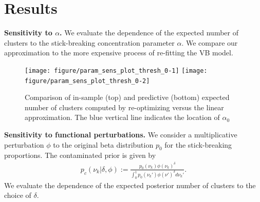 \documentclass[a0,plainsections]{sciposter}\usepackage[]{graphicx}\usepackage[]{color}
\newenvironment{knitrout}{}{} %
\newcommand{\Expect}{\mathbb{E}}
\newcommand{\etazopt}{\eta_z^{*}}
\newcommand{\etathetaopt}{\eta_\theta^{*}}
\newcommand{\QExpect}
{\Expect_{q\left(\theta, z \vert \eta_\theta, \etazopt(\eta_\theta)\right)}}
\begin{document}
\begin{minipage}[t]{0.45\textwidth}




\section*{Results}
\vspace{-0.3in}
{\bf \large Sensitivity to $\alpha$. }
We evaluate the dependence of the expected number of clusters to the stick-breaking concentration parameter $\alpha$. We compare our approximation to the more expensive process of re-fitting the VB model.  
%




\begin{figure}
\centering
\begin{knitrout}
\color{fgcolor}

{\centering \texttt{[image: figure/param\_sens\_plot\_thresh\_0-1]} 
\texttt{[image: figure/param\_sens\_plot\_thresh\_0-2]} 

}



\end{knitrout}
\caption{Comparison of in-sample (top) and predictive (bottom) expected number of clusters computed by re-optimizing versus the linear approximation. 
The blue vertical line indicates the location of $\alpha_0$}
\end{figure}

{\bf \large Sensitivity to functional perturbations. }
We consider a multiplicative perturbation $\phi$ to
the original beta distribution $p_0$ for the stick-breaking proportions. The contaminated prior is given by 
\begin{align}
\label{eq:expon_perturb}
	p_c(\nu_k \vert \delta, \phi) :=
  \frac{p_{0}(\nu_k)\phi(\nu_k)^\delta}
       {\int_0^1 p_0(\nu_k')\phi(\nu')^\delta d\nu_k'}.
\end{align}
We evaluate the dependence of the expected posterior number of clusters to the choice of $\delta$. 
\begin{figure}
\centering


\end{figure}
\end{minipage}
\end{document}
